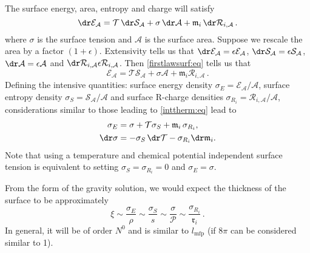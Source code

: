 \documentclass[12pt]{article}
\newcommand{\tloc}{\mathcal{T}}
\newcommand{\eloc}{\mathcal{E}}
\newcommand{\sloc}{\mathcal{S}}
\newcommand{\ploc}{\mathcal{P}}
\newcommand{\rloc}{\mathcal{R}}
\newcommand{\rl}{\mathfrak{r}}
\newcommand{\ml}{\mathfrak{m}}
\newcommand{\mfp}{l_{\mathrm{mfp}}}
\newcommand{\tc}{\mathcal{T_\mathrm{c}}}
\begin{document}
The surface energy, area, entropy and charge will satisfy
%
\begin{equation}\label{firstlawsurf:eq}
  \dr\eloc_\mathcal{A} = \tloc\,\dr\sloc_\mathcal{A} + \sigma\,\dr\mathcal{A} + \ml_i\,\dr\rloc_{i,\mathcal{A}}\,.
\end{equation}
%
where $\sigma$ is the surface tension and $\mathcal{A}$ is the surface area.
Suppose we rescale the area by a factor $(1+\epsilon)$.
Extensivity tells us that $\dr\eloc_\mathcal{A}=\epsilon\eloc_\mathcal{A}$, $\dr\sloc_\mathcal{A}=\epsilon\sloc_\mathcal{A}$, $\dr\mathcal{A}=\epsilon\mathcal{A}$ and $\dr\rloc_{i,\mathcal{A}}\epsilon\rloc_{i,\mathcal{A}}$.
Then \eqref{firstlawsurf:eq} tells us that
%
\begin{equation*}
  \eloc_\mathcal{A} = \tloc\sloc_\mathcal{A} + \sigma\mathcal{A} + \ml_i\rloc_{i,\mathcal{A}}\,.
\end{equation*}
%
Defining the intensive quantities: surface energy density $\sigma_E=\eloc_\mathcal{A}/\mathcal{A}$, surface entropy density $\sigma_S=\sloc_\mathcal{A}/\mathcal{A}$ and  surface R-charge densities $\sigma_{R_i}=\rloc_{i,\mathcal{A}}/\mathcal{A}$, considerations similar to those leading to \eqref{inttherm:eq} lead to
%
\begin{equation}\label{surftherm:eq}
  \begin{split}
    \sigma_E &= \sigma + \tloc \sigma_S + \ml_i \,\sigma_{R_i},
    \\
    \dr\sigma &= -\sigma_S\, \dr\tloc -\sigma_{R_i} \dr\ml_i.
  \end{split}
\end{equation}
%
Note that using a temperature and chemical potential independent surface tension is equivalent to setting $\sigma_S=\sigma_{R_i}=0$ and $\sigma_E=\sigma$.

From the form of the gravity solution, we would expect the thickness of the surface to be approximately
%
\begin{equation}\label{thick:eq}
  \xi \sim \frac{\sigma_E}{\rho} \sim \frac{\sigma_S}{s} \sim \frac{\sigma}{\ploc} \sim \frac{\sigma_{R_i}}{\rl_i}\,.
\end{equation}
%
In general, it will be of order $N^0$ and is similar to  $\mfp$ (if $8\pi$ can be considered similar to 1).
\end{document}
